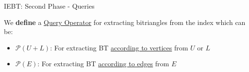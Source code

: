 \begin{frame}[fragile]{IEBT: Second Phase - Queries}
  \begin{center}
    \large We \textbf{define} a \underline{\color{red}Query Operator} for extracting bitriangles from the index which can be:
  \end{center}  
  \vspace{2em}
  \begin{itemize}
    \setlength\itemsep{2em}
    \item \textbf{$\mathcal{P}(U+L)$}: For extracting BT \underline{\color{blue}according to vertices} from $U$ or $L$
    \item \textbf{$\mathcal{P}(E)$}: For extracting BT \underline{\color{blue}according to edges} from $E$
  \end{itemize}  
\end{frame}





